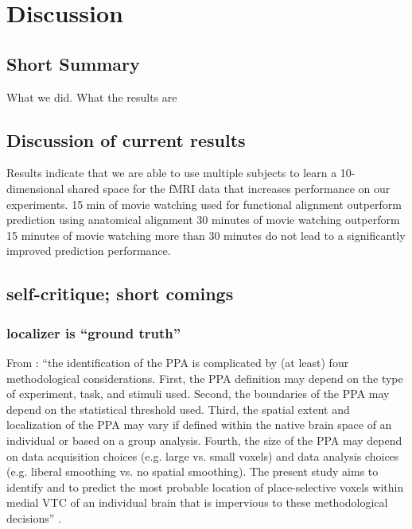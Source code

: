 

\section{Discussion}


\subsection{Short Summary}

What we did. What the results are

\subsection{Discussion of current results}

Results indicate that we are able to use multiple subjects to learn a
10-dimensional shared space for the fMRI data that increases performance on our
experiments.
%
15 min of movie watching used for functional alignment outperform prediction
using anatomical alignment
%
30 minutes of movie watching outperform 15 minutes of movie watching
%
more than 30 minutes do not lead to a significantly improved prediction
performance.
%

\subsection{self-critique; short comings}


\subsubsection{localizer is ``ground truth''}

From \citep{weiner2018defining}: ``the identification of the PPA is complicated by (at least) four
methodological considerations. First, the PPA definition may depend on the type
of experiment, task, and stimuli used. Second, the boundaries of the PPA may
depend on the statistical threshold used. Third, the spatial extent and
localization of the PPA may vary if defined within the native brain space of an
individual or based on a group analysis. Fourth, the size of the PPA may depend
on data acquisition choices (e.g. large vs. small voxels) and data analysis
choices (e.g. liberal smoothing vs. no spatial smoothing). The present study
aims to identify and to predict the most probable location of place-selective
voxels within medial VTC of an individual brain that is impervious to these
methodological decisions'' \citep{weiner2018defining}.

